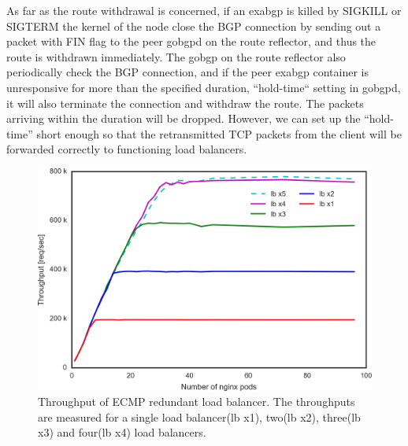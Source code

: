 As far as the route withdrawal is concerned, if an exabgp is killed by SIGKILL or SIGTERM the kernel of the node close the BGP connection by sending out a packet with FIN flag to the peer gobgpd on the route reflector, and thus the route is withdrawn immediately.
The gobgp on the route reflector also periodically check the BGP connection, and if the peer exabgp container is unresponsive for more than the specified duration, “hold-time“ setting in gobgpd, it will also terminate the connection and withdraw the route.
The packets arriving within the duration will be dropped.
However, we can set up the “hold-time” short enough so that the retransmitted TCP packets from the client will be forwarded correctly to functioning load balancers.

\FloatBarrier

\begin{figure}[h]
  \centering
  \includegraphics[width=0.9\columnwidth,left]{Figs/ecmp_lb_cubic_ieice}
  \centering
  \begin{minipage}{0.9\columnwidth}
        \caption[Throughput of ECMP redundant load balancer]{
          Throughput of ECMP redundant load balancer.
          The throughputs are measured for a single load balancer(lb x1), two(lb x2), three(lb x3) and four(lb x4) load balancers.
        }
  \end{minipage}
  \label{fig:ecmp_lb_cubic_ieice}
\end{figure}


